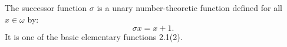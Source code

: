 The successor function $\sigma$ is a unary number-theoretic function defined for all $x \in \omega$ by:
$$\sigma x = x + 1.$$
It is one of the basic elementary functions 2.1(2).
